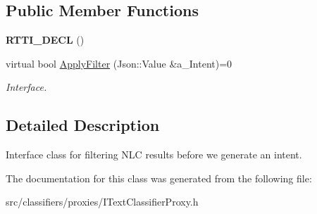 \subsection*{Public Member Functions}
\begin{DoxyCompactItemize}
\item 
\mbox{\label{class_i_text_classifier_proxy_1_1_i_class_filter_acf34568374966f0bbd465c36ab200eb5}} 
{\bfseries R\+T\+T\+I\+\_\+\+D\+E\+CL} ()
\item 
\mbox{\label{class_i_text_classifier_proxy_1_1_i_class_filter_aa1c2554574f7219189955377bf8c9074}} 
virtual bool \hyperlink{class_i_text_classifier_proxy_1_1_i_class_filter_aa1c2554574f7219189955377bf8c9074}{Apply\+Filter} (Json\+::\+Value \&a\+\_\+\+Intent)=0
\begin{DoxyCompactList}\small\item\em Interface. \end{DoxyCompactList}\end{DoxyCompactItemize}


\subsection{Detailed Description}
Interface class for filtering N\+LC results before we generate an intent. 

The documentation for this class was generated from the following file\+:\begin{DoxyCompactItemize}
\item 
src/classifiers/proxies/I\+Text\+Classifier\+Proxy.\+h\end{DoxyCompactItemize}

